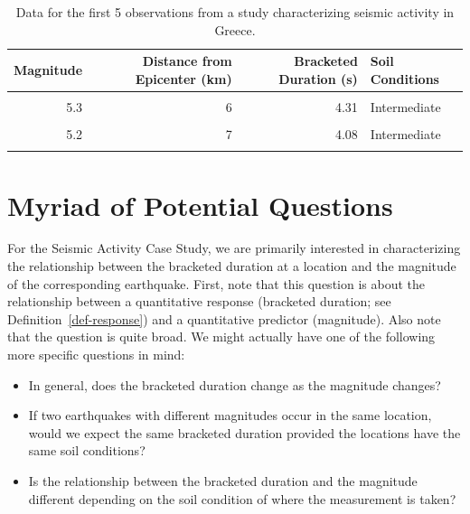 \documentclass[
  letterpaper,
  DIV=11,
  numbers=noendperiod]{scrreprt}
\providecommand{\tightlist}{%
  \setlength{\itemsep}{0pt}\setlength{\parskip}{0pt}}\usepackage{longtable,booktabs,array}
\theoremstyle{plain}
\theoremstyle{definition}
\theoremstyle{definition}
\theoremstyle{remark}
\begin{document}
\hypertarget{tbl-casegreece-table}{}
\begin{table}
\caption{\label{tbl-casegreece-table}Data for the first 5 observations from a study characterizing seismic
activity in Greece. }\tabularnewline

\centering
\begin{tabular}[t]{rrrl}
\toprule
Magnitude & Distance from Epicenter (km) & Bracketed Duration (s) & Soil Conditions\\
\midrule
\cellcolor{gray!6}{6.4} & \cellcolor{gray!6}{30} & \cellcolor{gray!6}{8.82} & \cellcolor{gray!6}{Soft}\\
5.3 & 6 & 4.31 & Intermediate\\
\cellcolor{gray!6}{5.6} & \cellcolor{gray!6}{15} & \cellcolor{gray!6}{5.74} & \cellcolor{gray!6}{Intermediate}\\
5.2 & 7 & 4.08 & Intermediate\\
\cellcolor{gray!6}{6.6} & \cellcolor{gray!6}{31} & \cellcolor{gray!6}{28.27} & \cellcolor{gray!6}{Soft}\\
\bottomrule
\end{tabular}
\end{table}

\hypertarget{sec-regquestions}{%
\chapter{Myriad of Potential Questions}\label{sec-regquestions}}

For the Seismic Activity Case Study, we are primarily interested in
characterizing the relationship between the bracketed duration at a
location and the magnitude of the corresponding earthquake. First, note
that this question is about the relationship between a quantitative
response (bracketed duration; see Definition~\ref{def-response}) and a
quantitative predictor (magnitude). Also note that the question is quite
broad. We might actually have one of the following more specific
questions in mind:

\begin{itemize}
\tightlist
\item
  In general, does the bracketed duration change as the magnitude
  changes?
\item
  If two earthquakes with different magnitudes occur in the same
  location, would we expect the same bracketed duration provided the
  locations have the same soil conditions?
\item
  Is the relationship between the bracketed duration and the magnitude
  different depending on the soil condition of where the measurement is
  taken?
\end{itemize}
\end{document}
